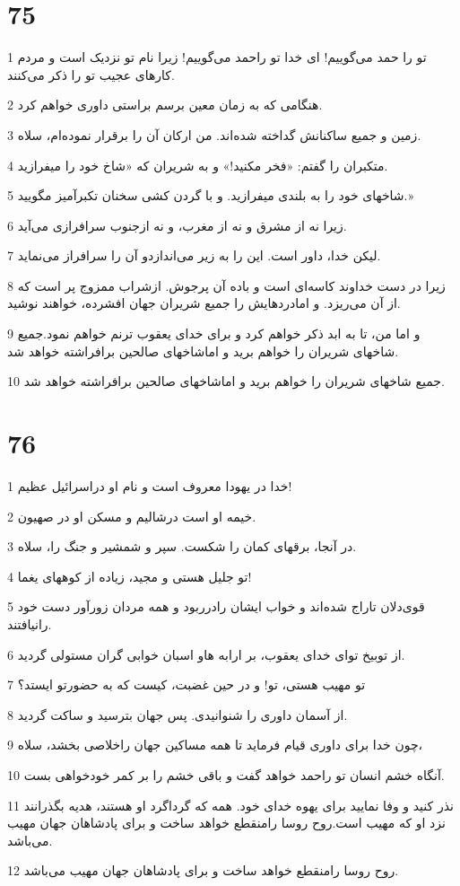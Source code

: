 \chapter{75}

\par 1 تو را حمد می‌گوییم! ای خدا تو راحمد می‌گوییم! زیرا نام تو نزدیک است و مردم کارهای عجیب تو را ذکر می‌کنند.
\par 2 هنگامی که به زمان معین برسم براستی داوری خواهم کرد.
\par 3 زمین و جمیع ساکنانش گداخته شده‌اند. من ارکان آن را برقرار نموده‌ام، سلاه.
\par 4 متکبران را گفتم: «فخر مکنید!» و به شریران که «شاخ خود را میفرازید.
\par 5 شاخهای خود را به بلندی میفرازید. و با گردن کشی سخنان تکبرآمیز مگویید.»
\par 6 زیرا نه از مشرق و نه از مغرب، و نه ازجنوب سرافرازی می‌آید.
\par 7 لیکن خدا، داور است. این را به زیر می‌اندازدو آن را سرافراز می‌نماید.
\par 8 زیرا در دست خداوند کاسه‌ای است و باده آن پرجوش. ازشراب ممزوج پر است که از آن می‌ریزد. و امادردهایش را جمیع شریران جهان افشرده، خواهند نوشید.
\par 9 و اما من، تا به ابد ذکر خواهم کرد و برای خدای یعقوب ترنم خواهم نمود.جمیع شاخهای شریران را خواهم برید و اماشاخهای صالحین برافراشته خواهد شد.
\par 10 جمیع شاخهای شریران را خواهم برید و اماشاخهای صالحین برافراشته خواهد شد.
 
\chapter{76}

\par 1 خدا در یهودا معروف است و نام او دراسرائیل عظیم!
\par 2 خیمه او است درشالیم و مسکن او در صهیون.
\par 3 در آنجا، برقهای کمان را شکست. سپر و شمشیر و جنگ را، سلاه.
\par 4 تو جلیل هستی و مجید، زیاده از کوههای یغما!
\par 5 قوی‌دلان تاراج شده‌اند و خواب ایشان رادرربود و همه مردان زورآور دست خود رانیافتند.
\par 6 از توبیخ تو‌ای خدای یعقوب، بر ارابه هاو اسبان خوابی گران مستولی گردید.
\par 7 تو مهیب هستی، تو! و در حین غضبت، کیست که به حضورتو ایستد؟
\par 8 از آسمان داوری را شنوانیدی. پس جهان بترسید و ساکت گردید.
\par 9 چون خدا برای داوری قیام فرماید تا همه مساکین جهان راخلاصی بخشد، سلاه،
\par 10 آنگاه خشم انسان تو راحمد خواهد گفت و باقی خشم را بر کمر خودخواهی بست.
\par 11 نذر کنید و وفا نمایید برای یهوه خدای خود. همه که گرداگرد او هستند، هدیه بگذرانند نزد او که مهیب است.روح روسا رامنقطع خواهد ساخت و برای پادشاهان جهان مهیب می‌باشد.
\par 12 روح روسا رامنقطع خواهد ساخت و برای پادشاهان جهان مهیب می‌باشد.
 

